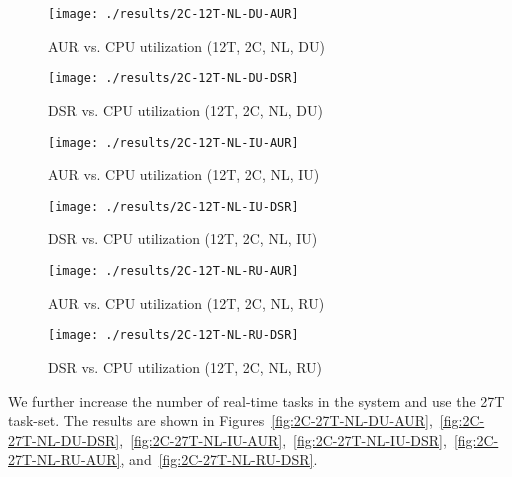 \documentclass[12pt,dvips]{report}
\begin{document}
\begin{figure} [htbp]
  \centering
  \texttt{[image: ./results/2C-12T-NL-DU-AUR]}
  \caption{AUR vs. CPU utilization (12T, 2C, NL, DU)}
  \label{fig:2C-12T-NL-DU-AUR}
\end{figure}

\begin{figure} [htbp]
  \centering
  \texttt{[image: ./results/2C-12T-NL-DU-DSR]}
  \caption{DSR vs. CPU utilization (12T, 2C, NL, DU)}
  \label{fig:2C-12T-NL-DU-DSR}
\end{figure}
 
\begin{figure} [htbp]
  \centering
  \texttt{[image: ./results/2C-12T-NL-IU-AUR]}
  \caption{AUR vs. CPU utilization (12T, 2C, NL, IU)}
  \label{fig:2C-12T-NL-IU-AUR}
\end{figure}
 
 \begin{figure} [htbp]
  \centering
  \texttt{[image: ./results/2C-12T-NL-IU-DSR]}
  \caption{DSR vs. CPU utilization (12T, 2C, NL, IU)}
  \label{fig:2C-12T-NL-IU-DSR}
\end{figure}

\begin{figure} [htbp]
  \centering
  \texttt{[image: ./results/2C-12T-NL-RU-AUR]}
  \caption{AUR vs. CPU utilization (12T, 2C, NL, RU)}
  \label{fig:2C-12T-NL-RU-AUR}
\end{figure}

\begin{figure} [htbp]
  \centering
  \texttt{[image: ./results/2C-12T-NL-RU-DSR]}
  \caption{DSR vs. CPU utilization (12T, 2C, NL, RU)}
  \label{fig:2C-12T-NL-RU-DSR}
\end{figure}

We further increase the number of real-time tasks in the system and use the 27T task-set. The results are shown in Figures~\ref{fig:2C-27T-NL-DU-AUR},~\ref{fig:2C-27T-NL-DU-DSR},~\ref{fig:2C-27T-NL-IU-AUR},~\ref{fig:2C-27T-NL-IU-DSR},~\ref{fig:2C-27T-NL-RU-AUR}, and~\ref{fig:2C-27T-NL-RU-DSR}.
\end{document}
